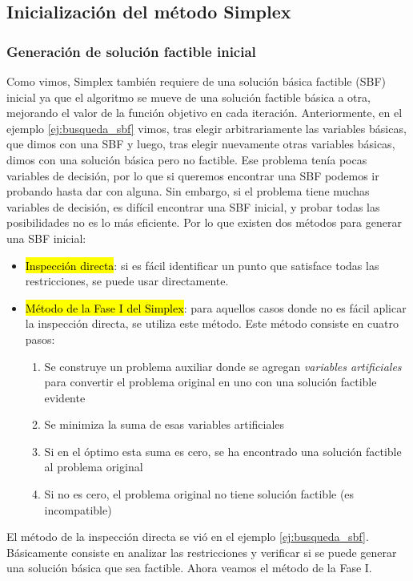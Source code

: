 \subsection{Inicialización del método Simplex}

\subsubsection{Generación de solución factible inicial}

Como vimos, Simplex también requiere de una solución básica factible (SBF) inicial ya que el algoritmo se mueve de una solución factible básica a otra, mejorando el valor de la función objetivo en cada iteración. Anteriormente, en el ejemplo \ref{ej:busqueda_sbf} vimos, tras elegir arbitrariamente las variables básicas, que dimos con una SBF y luego, tras elegir nuevamente otras variables básicas, dimos con una solución básica pero no factible. Ese problema tenía pocas variables de decisión, por lo que si queremos encontrar una SBF podemos ir probando hasta dar con alguna. Sin embargo, si el problema tiene muchas variables de decisión, es difícil encontrar una SBF inicial, y probar todas las posibilidades no es lo más eficiente. Por lo que existen dos métodos para generar una SBF inicial:
\begin{itemize}
  \item \hl{Inspección directa}: si es fácil identificar un punto que satisface todas las restricciones, se puede usar directamente.
  \item \hl{Método de la Fase I del Simplex}: para aquellos casos donde no es fácil aplicar la inspección directa, se utiliza este método. Este método consiste en cuatro pasos:
  \begin{enumerate}
    \item Se construye un problema auxiliar donde se agregan \textit{variables artificiales} para convertir el problema original en uno con una solución factible evidente
    \item Se minimiza la suma de esas variables artificiales
    \item Si en el óptimo esta suma es cero, se ha encontrado una solución factible al problema original
    \item Si no es cero, el problema original no tiene solución factible (es incompatible)
  \end{enumerate}
\end{itemize}

\noindent El método de la inspección directa se vió en el ejemplo \ref{ej:busqueda_sbf}. Básicamente consiste en analizar las restricciones y verificar si se puede generar una solución básica que sea factible. Ahora veamos el método de la Fase I.

